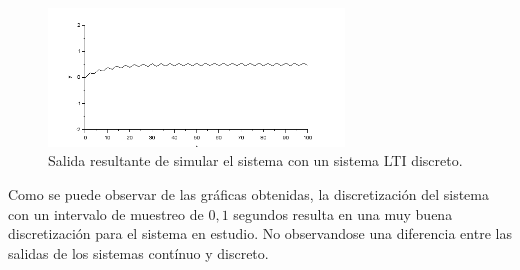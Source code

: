\documentclass{article}
\begin{document}
              \begin{figure}[h!]
            \centering
            \includegraphics[width=0.7\textwidth]{./Imagenes/Simulaciones/salidaDiscreta.png}
            \caption{Salida resultante de simular el sistema con un sistema LTI discreto.}
            \label{salidaDiscreta}
        \end{figure}


Como se puede observar de las gráficas obtenidas, la discretización del sistema con un intervalo de muestreo de $0,1$ segundos resulta en una muy buena discretización para el sistema en estudio.
No observandose una diferencia entre las salidas de los sistemas contínuo y discreto.







    
\end{document}
